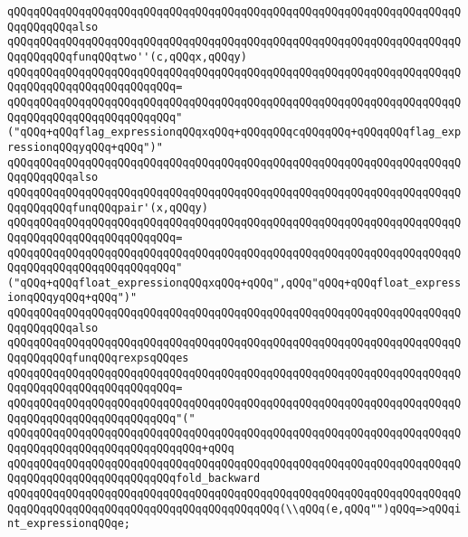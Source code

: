 \verb|qQQqqQQqqQQqqQQqqQQqqQQqqQQqqQQqqQQqqQQqqQQqqQQqqQQqqQQqqQQqqQQqqQQqqQQqqQQqqQQqalso|\newline
\verb|qQQqqQQqqQQqqQQqqQQqqQQqqQQqqQQqqQQqqQQqqQQqqQQqqQQqqQQqqQQqqQQqqQQqqQQqqQQqqQQqfunqQQqtwo''(c,qQQqx,qQQqy)|\newline
\verb|qQQqqQQqqQQqqQQqqQQqqQQqqQQqqQQqqQQqqQQqqQQqqQQqqQQqqQQqqQQqqQQqqQQqqQQqqQQqqQQqqQQqqQQqqQQqqQQq=|\newline
\verb|qQQqqQQqqQQqqQQqqQQqqQQqqQQqqQQqqQQqqQQqqQQqqQQqqQQqqQQqqQQqqQQqqQQqqQQqqQQqqQQqqQQqqQQqqQQqqQQq"("qQQq+qQQqflag_expressionqQQqxqQQq+qQQqqQQqcqQQqqQQq+qQQqqQQqflag_expressionqQQqyqQQq+qQQq")"|\newline
\newline
\verb|qQQqqQQqqQQqqQQqqQQqqQQqqQQqqQQqqQQqqQQqqQQqqQQqqQQqqQQqqQQqqQQqqQQqqQQqqQQqqQQqalso|\newline
\verb|qQQqqQQqqQQqqQQqqQQqqQQqqQQqqQQqqQQqqQQqqQQqqQQqqQQqqQQqqQQqqQQqqQQqqQQqqQQqqQQqfunqQQqpair'(x,qQQqy)|\newline
\verb|qQQqqQQqqQQqqQQqqQQqqQQqqQQqqQQqqQQqqQQqqQQqqQQqqQQqqQQqqQQqqQQqqQQqqQQqqQQqqQQqqQQqqQQqqQQqqQQq=|\newline
\verb|qQQqqQQqqQQqqQQqqQQqqQQqqQQqqQQqqQQqqQQqqQQqqQQqqQQqqQQqqQQqqQQqqQQqqQQqqQQqqQQqqQQqqQQqqQQqqQQq"("qQQq+qQQqfloat_expressionqQQqxqQQq+qQQq",qQQq"qQQq+qQQqfloat_expressionqQQqyqQQq+qQQq")"|\newline
\newline
\verb|qQQqqQQqqQQqqQQqqQQqqQQqqQQqqQQqqQQqqQQqqQQqqQQqqQQqqQQqqQQqqQQqqQQqqQQqqQQqqQQqalso|\newline
\verb|qQQqqQQqqQQqqQQqqQQqqQQqqQQqqQQqqQQqqQQqqQQqqQQqqQQqqQQqqQQqqQQqqQQqqQQqqQQqqQQqfunqQQqrexpsqQQqes|\newline
\verb|qQQqqQQqqQQqqQQqqQQqqQQqqQQqqQQqqQQqqQQqqQQqqQQqqQQqqQQqqQQqqQQqqQQqqQQqqQQqqQQqqQQqqQQqqQQqqQQq=|\newline
\verb|qQQqqQQqqQQqqQQqqQQqqQQqqQQqqQQqqQQqqQQqqQQqqQQqqQQqqQQqqQQqqQQqqQQqqQQqqQQqqQQqqQQqqQQqqQQqqQQq"("|\newline
\verb|qQQqqQQqqQQqqQQqqQQqqQQqqQQqqQQqqQQqqQQqqQQqqQQqqQQqqQQqqQQqqQQqqQQqqQQqqQQqqQQqqQQqqQQqqQQqqQQqqQQq+qQQq|\newline
\verb|qQQqqQQqqQQqqQQqqQQqqQQqqQQqqQQqqQQqqQQqqQQqqQQqqQQqqQQqqQQqqQQqqQQqqQQqqQQqqQQqqQQqqQQqqQQqqQQqfold_backward|\newline
\verb|qQQqqQQqqQQqqQQqqQQqqQQqqQQqqQQqqQQqqQQqqQQqqQQqqQQqqQQqqQQqqQQqqQQqqQQqqQQqqQQqqQQqqQQqqQQqqQQqqQQqqQQqqQQqqQQq(\\qQQq(e,qQQq"")qQQq=>qQQqint_expressionqQQqe;|\newline
